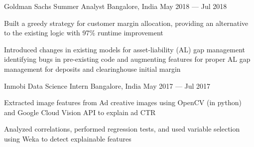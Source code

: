 \cventry
	{Goldman Sachs}
	{Summer Analyst}
	{Bangalore, India}
	{May 2018 --- Jul 2018}
	{%
		\begin{cvitems}
            \item Built a greedy strategy for customer margin allocation, providing an alternative to the existing logic with 97\% runtime improvement
            \item Introduced changes in existing models for asset-liability (AL) gap management identifying bugs in pre-existing code and augmenting features for proper AL gap management for deposits and clearinghouse initial margin
		\end{cvitems}
	}

\cventry
    {Inmobi}
    {Data Science Intern}
    {Bangalore, India}
    {May 2017 --- Jul 2017}
    {%
        \begin{cvitems}
            \item Extracted image features from Ad creative images using OpenCV (in python) and Google Cloud Vision API to explain ad CTR
            \item Analyzed correlations, performed regression tests, and used variable selection using Weka to detect explainable features
        \end{cvitems}
    }
